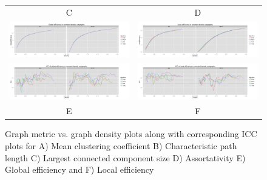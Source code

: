 \documentclass{frontiersSCNS} %
\begin{document}
\begin{figure}
\begin{center}
\begin{tabular}{cc}
C & D \\
\includegraphics[width=0.5\linewidth]{figures/geff_plot.png}  & \includegraphics[width=0.5\linewidth]{figures/leff_plot.png} \\
\includegraphics[width=0.5\linewidth]{figures/geff_icc_plot.png} & \includegraphics[width=0.5\linewidth]{figures/leff_icc_plot.png}\\
E & F 
\end{tabular}
\caption{Graph metric vs. graph density plots along with corresponding ICC plots for A) Mean clustering coefficient  B) Characteristic path length C) Largest connected component size D) Assortativity E) Global efficiency and F) Local efficiency}
\label{fig:vsdensity}
\end{center}
\end{figure}
\end{document}
